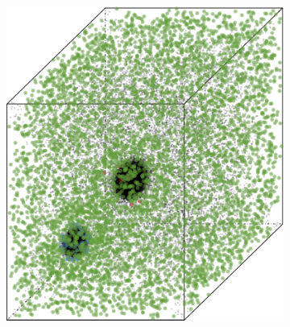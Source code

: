 		\begin{figure}
			\centering
			\begin{subfigure}{0.23\textwidth}
				\centering
				\includegraphics[keepaspectratio=true, width=\textwidth, height=0.23\textheight]{discussion/img/ferdosi_2_60000_anisotropy.png}
				\caption{}
				\label{fig:discussion:anisotropy:ferdosi2}
			\end{subfigure}
			\begin{subfigure}{0.23\textwidth}
				\centering

\end{subfigure}
\end{figure}
